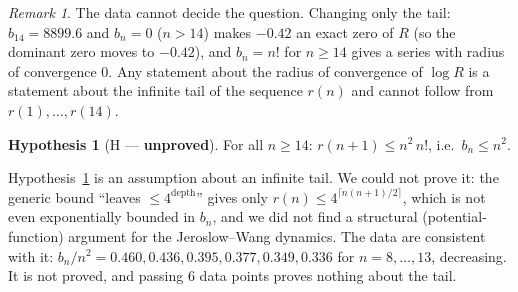 \documentclass[11pt]{article}
\theoremstyle{definition}
\newtheorem{hypothesis}{Hypothesis}
\theoremstyle{remark}
\newtheorem{remark}{Remark}
\begin{document}
\begin{remark}\label{rem:tail}
The data cannot decide the question. Changing only the tail: $b_{14}=8899.6$ and $b_n=0$ ($n>14$) makes $-0.42$ an exact zero of $R$ (so the
dominant zero moves to $-0.42$), and $b_n=n!$ for $n\ge14$ gives a series with radius of convergence $0$. Any statement about the radius of convergence
of $\log R$ is a statement about the infinite tail of the sequence $r(n)$ and cannot follow from $r(1),\dots,r(14)$.
\end{remark}

\begin{hypothesis}[H --- \textbf{unproved}]\label{hyp:H}
For all $n\ge14$: $r(n+1)\le n^2\,n!$, i.e.\ $b_n\le n^2$.
\end{hypothesis}
Hypothesis~\ref{hyp:H} is an assumption about an infinite tail. We could not prove it: the generic bound ``leaves $\le 4^{\text{depth}}$'' gives only $r(n)\le 4^{\lceil n(n+1)/2\rceil}$,
which is not even exponentially bounded in $b_n$, and we did not find a structural (potential-function) argument for the Jeroslow--Wang dynamics. The data are consistent with it: $b_n/n^2=0.460,0.436,0.395,0.377,0.349,0.336$ for
$n=8,\dots,13$, decreasing. It is not proved, and passing 6 data points proves nothing about the tail.
\end{document}
